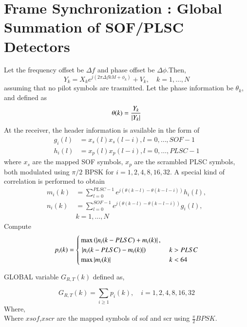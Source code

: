 \documentclass[journal,12pt,twocolumn]{IEEEtran}
\begin{document}
\section{Frame Synchronization : Global Summation of SOF/PLSC Detectors} 
%
%
Let the frequency offset be $\Delta f$ and phase offset be $\Delta \phi$.Then,
\begin{equation}
\label{eq:freq_offset_model}
Y_k= X_k e^{j(2\pi\Delta fkM+\phi_k)} + V_k, \quad k = 1,\dots,N 
\end{equation}
%
assuming that no pilot symbols are trasmitted. 
Let the phase information be $\theta_k$, and defined as
%
\begin{equation}
\theta(k) = \frac{Y_k}{\left\vert Y_k\right\vert}
\end{equation}
%
At the receiver, the header information is available in the form of 
\begin{align}
g_i(l)&=x_s(l)x_s(l-i), l = 0,\dots, SOF-1
\\
h_i(l)&=x_p(l)x_p(l-i), l = 0,\dots, PLSC-1
\end{align}
%
where $x_s$ are the mapped SOF symbols, $x_p$ are the scrambled PLSC  symbols, both  modulated using $\pi/2$ BPSK
for $i=1,2,4,8,16,32$.
A special kind of correlation is performed to obtain
\begin{align}
m_i(k)&=\sum_{l=0}^{PLSC-1} e^{j(\theta(k-l)-\theta(k-l-i))} h_i(l),
\\
n_i(k)&=\sum_{l=0}^{SOF-1} e^{j(\theta(k-l)-\theta(k-l-i))} g_i(l) ,
\\
&k = 1, \dots, N 
\end{align}
%
Compute
\begin{align}
p_i(k)=
\begin{cases}
\max \left(\left\vert n_i({k-PLSC})+m_i(k)\right\vert,\right. &
\\
\left.\left\vert n_i({k-PLSC})-m_i(k)\right\vert\right) & k > PLSC
\\
\max \left\vert m_i(k)\right\vert  & k < 64
\end{cases}
\end{align}

 GLOBAL variable $G_{R,T}(k)$  \cite{frame_offset} defined as,

\begin{equation}
G_{R,T}(k)=\sum_{i\geq1}p_i(k) , \quad i=1,2,4,8,16,32
\end{equation}
Where,
%
%
\begin{equation}
\end{equation}
\begin{equation}
\end{equation} 
Where $xsof$,$xscr$ are the mapped symbols of sof and scr using $\frac{\pi}{2} BPSK$. 
\end{document}
